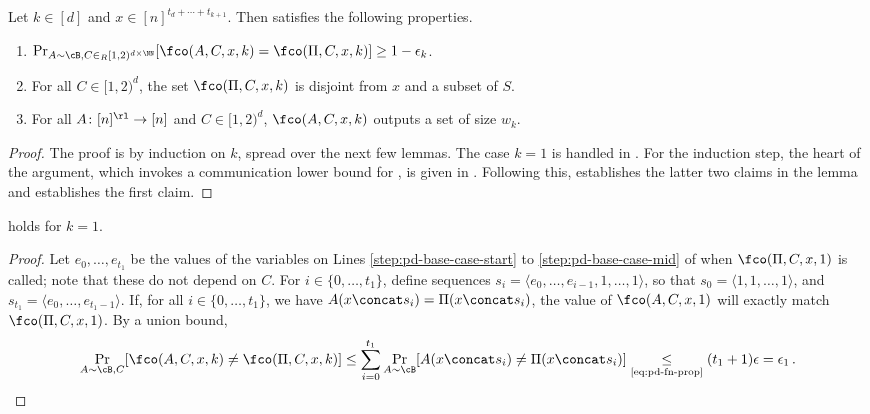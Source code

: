 \begin{itemize}
\begin{itemize}
\begin{lemma}\label{lem:pd-main-recursion}
  Let $k \in [d]$ and $x \in [n]^{t_d + \cdots + t_{k+1}}$. Then \fco
  satisfies the following properties.
  \begin{enumerate}
    \item $\Pr_{A \sim \cB, C \in_R [1,2)^{d \times \NN}}[\fco(A, C, x, k) =
    \fco(\Pi, C, x, k)] \ge 1 - \epsilon_k$.
    \item For all $C \in [1,2)^d$, the set $\fco(\Pi, C, x, k)$ is disjoint from $x$ and a subset of $S$. 
    \item For all $A \colon [n]^\rl \to [n]$ and $C \in [1,2)^d$,
    $\fco(A,C,x,k)$ outputs a set of size $w_k$.
  \end{enumerate}
\end{lemma}
\begin{proof}
  The proof is by induction on $k$, spread over the next few lemmas. The case
  $k = 1$ is handled in . For the induction step, the
  heart of the argument, which invokes a communication lower bound for \avoid, is
  given in . Following this,
   establishes the latter two claims in the lemma
  and  establishes the first claim.
\end{proof}

\begin{lemma}\label{lem:pd-base-case} 
   holds for $k = 1$.
\end{lemma}
%
\begin{proof}%
  Let $e_0,\ldots,e_{t_1}$ be the values of the variables on Lines
  \ref{step:pd-base-case-start} to \ref{step:pd-base-case-mid} of
   when $\fco(\Pi, C, x, 1)$ is called; note that
  these do not depend on $C$. For $i \in \{0,\ldots,t_1\}$, define sequences
  $s_i = \langle e_0,\ldots,e_{i-1},1,\ldots,1 \rangle$, so that $s_0 =
  \langle 1,1,\ldots,1 \rangle$, and $s_{t_1} = \langle e_0,\ldots,e_{t_1-1}
  \rangle$. If, for all $i \in \{0,\ldots,t_1\}$, we have $A(x \concat s_i) =
  \Pi(x \concat s_i)$, the value of $\fco(A, C, x, 1)$ will exactly match
  $\fco(\Pi,C,x,1)$. By a union bound,
  \begin{align*}
    \Pr_{A \sim \cB, C}[\fco(A, C, x, k) \ne \fco(\Pi, C, x, k)] 
    \le \sum_{i = 0}^{t_1} \Pr_{A \sim \cB}[A(x \concat s_i) \ne \Pi(x \concat s_i)] 
    \underset{\text{\cref{eq:pd-fn-prop}}}{\le} (t_1 + 1) \epsilon 
    = \epsilon_1 \,.
  \end{align*}
  

\end{proof}
\end{itemize}
\end{itemize}
